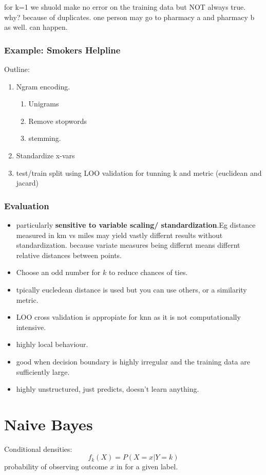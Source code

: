 \documentclass{article}
\begin{document}
for k=1 we shuold make no error on the training data but NOT always true. why? because of duplicates. one person may go to pharmacy a and pharmacy b as well. can happen.  


\subsubsection{Example: Smokers Helpline}
Outline:
\begin{enumerate}
\item Ngram encoding. 
\begin{enumerate}
\item Unigrams
\item Remove stopwords
\item stemming. 
\end{enumerate}
\item Standardize x-vars
\item test/train split using LOO validation for tunning k and metric (euclidean and jacard)
\end{enumerate}


\subsubsection{Evaluation}

\begin{itemize}
\item particularly \textbf{sensitive to variable scaling/ standardization}.Eg distance measured in km vs miles may yield vastly differnt results without standardization. because variate measures being differnt means differnt relative distances between points. 
\item Choose an odd number for $k$ to reduce chances of ties. 
\item tpically eucledean distance is used but you can use others, or a similarity metric.
\item LOO cross validation is appropiate for knn as it is not computationally intensive.
\item highly local behaviour.
\item good when decision boundary is highly irregular and the training data are sufficiently large.
\item highly unstructured, just predicts, doesn't learn anything. 
\end{itemize}


\section{Naive Bayes}
Conditional densities:
\[f_k(X) = P(X=x|Y=k)\] probability of observing outcome $x$ in for a given label.
\end{document}
